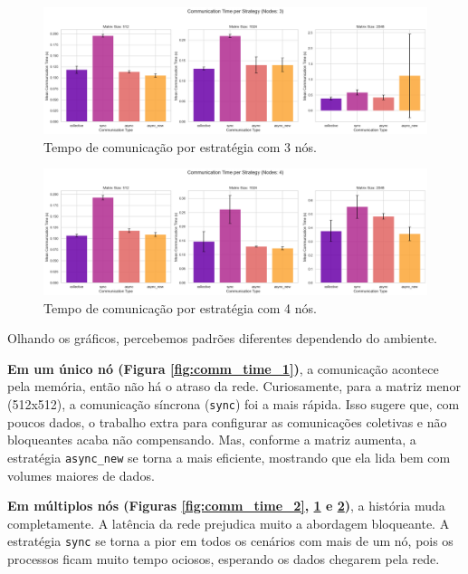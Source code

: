 \documentclass{article}
\begin{document}
\begin{figure}[H]
    \centering
    \includegraphics[width=1\linewidth]{images/comm_time_3nodes.png}
    \caption{Tempo de comunicação por estratégia com 3 nós.}
    \label{fig:comm_time_3}
\end{figure}

\begin{figure}[H]
    \centering
    \includegraphics[width=1\linewidth]{images/comm_time_4nodes.png}
    \caption{Tempo de comunicação por estratégia com 4 nós.}
    \label{fig:comm_time_4}
\end{figure}

Olhando os gráficos, percebemos padrões diferentes dependendo do ambiente.

\textbf{Em um único nó (Figura \ref{fig:comm_time_1})}, a comunicação acontece pela memória, então não há o atraso da rede. Curiosamente, para a matriz menor (512x512), a comunicação síncrona (\texttt{sync}) foi a mais rápida. Isso sugere que, com poucos dados, o trabalho extra para configurar as comunicações coletivas e não bloqueantes acaba não compensando. Mas, conforme a matriz aumenta, a estratégia \texttt{async\_new} se torna a mais eficiente, mostrando que ela lida bem com volumes maiores de dados.

\textbf{Em múltiplos nós (Figuras \ref{fig:comm_time_2}, \ref{fig:comm_time_3} e \ref{fig:comm_time_4})}, a história muda completamente. A latência da rede prejudica muito a abordagem bloqueante. A estratégia \texttt{sync} se torna a pior em todos os cenários com mais de um nó, pois os processos ficam muito tempo ociosos, esperando os dados chegarem pela rede.
\end{document}
